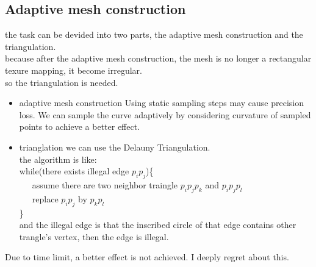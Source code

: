 \documentclass[acmtog]{acmart}
\begin{document}
\subsection{Adaptive mesh construction}
the task can be devided into two parts,
the adaptive mesh construction and the triangulation.\\
because after the adaptive mesh construction, the mesh is no longer a rectangular texure mapping, it become irregular.\\
so the triangulation is needed.
\begin{itemize}
\item adaptive mesh construction
Using static sampling steps may cause precision loss.
We can sample the curve adaptively by considering curvature of sampled points to achieve a better effect.

\item trianglation
we can use the Delauny Triangulation.\\
the algorithm is like:\\
while(there exists illegal edge $p_ip_j$)\{\\
\ \ \ assume there are two neighbor traingle $p_ip_jp_k$ and $p_ip_jp_l$\\
\ \ \ replace $p_ip_j$ by $p_kp_l$\\
\}\\
and the illegal edge is that the inscribed circle of that edge contains other trangle's vertex, then the edge is illegal. 
\end{itemize}

Due to time limit, a better effect is not achieved. I deeply regret about this.
\end{document}

